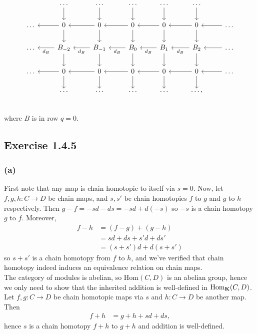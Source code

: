 \documentclass{article}
\theoremstyle{definition}
\newcommand{\Hom}{\text{Hom}}
\newcommand{\catname}[1]{{\normalfont\textbf{#1}}}
\newcommand{\CK}{\catname{K}}
\begin{document}
\[
\begin{tikzcd}
	& \ldots \arrow[d] 
	& \ldots \arrow[d]
	& \ldots \arrow[d] 
	& \ldots \arrow[d]
	& \ldots \arrow[d] 
	\\
	\ldots
	& 0 \arrow[l] \arrow[d] 
	& 0 \arrow[l] \arrow[d] 
	& 0 \arrow[l] \arrow[d] 
	& 0 \arrow[l] \arrow[d] 
	& 0 \arrow[l] \arrow[d] 
	& \ldots \arrow[l]
	\\
	\ldots
	& B_{-2} \arrow[l, "d_B"] \arrow[d] 
	& B_{-1} \arrow[l, "d_B"] \arrow[d] 
	& B_{0} \arrow[l, "d_B"] \arrow[d] 
	& B_{1} \arrow[l, "d_B"] \arrow[d] 
	& B_{2} \arrow[l, "d_B"] \arrow[d] 
	& \ldots \arrow[l]
	\\
	\ldots
	& 0 \arrow[l] \arrow[d] 
	& 0 \arrow[l] \arrow[d] 
	& 0 \arrow[l] \arrow[d] 
	& 0 \arrow[l] \arrow[d] 
	& 0 \arrow[l] \arrow[d] 
	& \ldots \arrow[l]
	\\
	& \ldots
	& \ldots
	& \ldots
	& \ldots
	& \ldots,
	\\
\end{tikzcd}
\]
where $B$ is in row $q = 0$.

\subsection*{Exercise 1.4.5}
\subsubsection*{(a)}

First note that any map is chain homotopic to itself via $s = 0$. Now, let $f,
g, h : C \to D$ be chain maps, and $s, s'$ be chain homotopies $f$ to $g$ and
$g$ to $h$ respectively. Then $g - f = -sd - ds = -sd + d(-s)$ so $-s$ is a
chain homotopy $g$ to $f$. Moreover,
\begin{align*}
	f - h
	&=
	(f - g) + (g - h) \\
	&=
	sd + ds + s'd + ds' \\
	&=
	(s + s')d + d(s + s')
\end{align*}
so $s + s'$ is a chain homotopy from $f$ to $h$, and we've verified that chain
homotopy indeed induces an equivalence relation on chain maps. \\

The category of modules is abelian, so $\Hom(C, D)$ is an abelian group, hence
we only need to show that the inherited addition is well-defined in
$\Hom_{\CK}(C, D)$. Let $f, g : C \to D$ be chain homotopic maps via $s$ and $h : C \to D$
be another map. Then 
\begin{align*}
	f + h
	&=
	g + h + sd + ds,
\end{align*} 
hence $s$ is a chain homotopy $f + h$ to $g + h$ and addition is well-defined.
\end{document}
